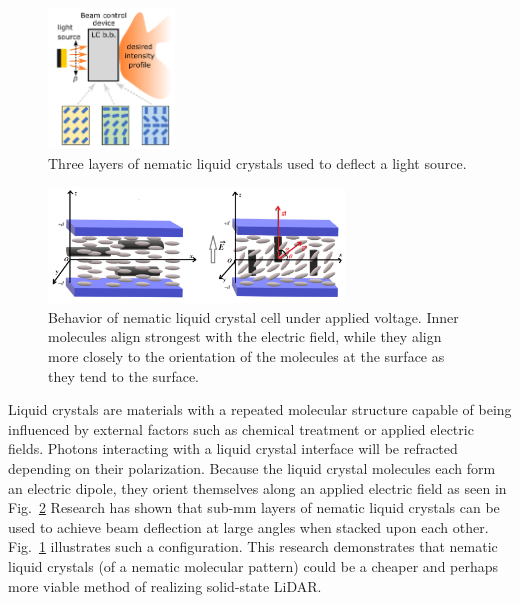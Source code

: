 \documentclass[12pt]{article}
\begin{document}
\begin{figure}[!h]
  \begin{center}
    \includegraphics[width=0.30\textwidth]{images/liquidCrystalBeamSteering.png}
    \caption{Three layers of nematic liquid crystals used to deflect a light source.\autocite{zhang2023}}\label{fig:lcbeamsteering}
  \end{center}
\end{figure}

\begin{figure}[!h]
  \begin{center}
    \includegraphics[width=0.70\textwidth]{images/lcelectricfield.png}
    \caption{Behavior of nematic liquid crystal cell under applied voltage. Inner molecules align strongest with the electric field, while they align more closely to the orientation of the molecules at the surface as they tend to the surface. \autocite{cirtoaje2021}}\label{fig:lcelectricfield}
  \end{center}
\end{figure}

Liquid crystals are materials with a repeated molecular structure capable of being influenced by external factors such as chemical treatment or applied electric fields.
Photons interacting with a liquid crystal interface will be refracted depending on their polarization. \autocite{cirtoaje2021}
Because the liquid crystal molecules each form an electric dipole, they orient themselves along an applied electric field as seen in Fig.~\ref{fig:lcelectricfield}
Research has shown that sub-mm layers of nematic liquid crystals can be used to achieve beam deflection at large angles when stacked upon each other. \autocite{zhang2023}
Fig.~\ref{fig:lcbeamsteering} illustrates such a configuration.
This research demonstrates that nematic liquid crystals (of a nematic molecular pattern) could be a cheaper and perhaps more viable method of realizing solid-state LiDAR.
\end{document}
